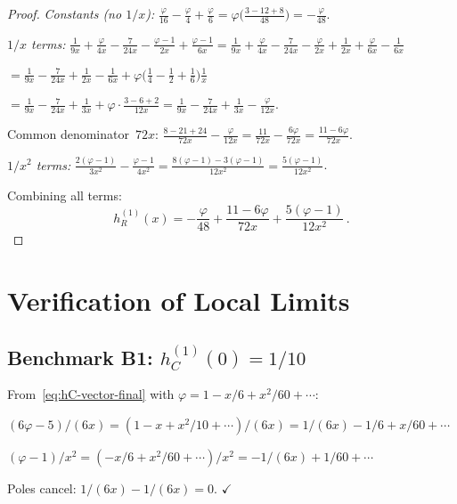 \documentclass[12pt,a4paper]{article}
\theoremstyle{definition}
\theoremstyle{remark}
\begin{document}
\begin{proof}
\textit{Constants (no $1/x$):}
$\frac{\varphi}{16} - \frac{\varphi}{4} + \frac{\varphi}{6}
= \varphi\bigl(\frac{3 - 12 + 8}{48}\bigr) = -\frac{\varphi}{48}$.

\textit{$1/x$ terms:}
$\frac{1}{9x} + \frac{\varphi}{4x} - \frac{7}{24x}
- \frac{\varphi-1}{2x} + \frac{\varphi-1}{6x}
= \frac{1}{9x} + \frac{\varphi}{4x} - \frac{7}{24x}
- \frac{\varphi}{2x} + \frac{1}{2x}
+ \frac{\varphi}{6x} - \frac{1}{6x}$

$= \frac{1}{9x} - \frac{7}{24x} + \frac{1}{2x} - \frac{1}{6x}
+ \varphi\bigl(\frac{1}{4} - \frac{1}{2} + \frac{1}{6}\bigr)\frac{1}{x}$

$= \frac{1}{9x} - \frac{7}{24x} + \frac{1}{3x}
+ \varphi\cdot\frac{3-6+2}{12x}
= \frac{1}{9x} - \frac{7}{24x} + \frac{1}{3x}
- \frac{\varphi}{12x}$.

Common denominator~$72x$: $\frac{8 - 21 + 24}{72x} - \frac{\varphi}{12x}
= \frac{11}{72x} - \frac{6\varphi}{72x}
= \frac{11 - 6\varphi}{72x}$.

\textit{$1/x^2$ terms:}
$\frac{2(\varphi-1)}{3x^2} - \frac{\varphi-1}{4x^2}
= \frac{8(\varphi-1) - 3(\varphi-1)}{12x^2}
= \frac{5(\varphi-1)}{12x^2}$.

\medskip\noindent
Combining all terms:
\begin{equation*}
  h_R^{(1)}(x) = -\frac{\varphi}{48}
  + \frac{11 - 6\varphi}{72x}
  + \frac{5(\varphi-1)}{12x^2}\,.
\end{equation*}
\end{proof}


\section{Verification of Local Limits}
\label{sec:local-limits}

\subsection{Benchmark B1: $h_C^{(1)}(0) = 1/10$}

From~\eqref{eq:hC-vector-final} with
$\varphi = 1 - x/6 + x^2/60 + \cdots$:

$(6\varphi-5)/(6x) = (1 - x + x^2/10 + \cdots)/(6x)
= 1/(6x) - 1/6 + x/60 + \cdots$

$(\varphi-1)/x^2 = (-x/6 + x^2/60 + \cdots)/x^2
= -1/(6x) + 1/60 + \cdots$

Poles cancel: $1/(6x) - 1/(6x) = 0$. $\checkmark$
\end{document}
